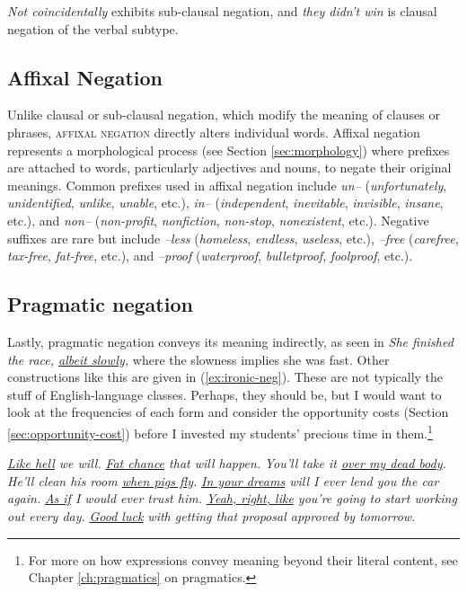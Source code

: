 \textit{Not coincidentally} exhibits sub-clausal negation, and \textit{they didn't win} is clausal negation of the verbal subtype.

\subsection{Affixal Negation}

Unlike clausal or sub-clausal negation, which modify the meaning of clauses or phrases, \textsc{affixal negation} directly alters individual words. Affixal negation represents a morphological process (see Section \ref{sec:morphology}) where prefixes are attached to words, particularly adjectives and nouns, to negate their original meanings. Common prefixes used in affixal negation include \textit{un--} (\textit{unfortunately}, \textit{unidentified}, \textit{unlike}, \textit{unable}, etc.), \textit{in--} (\textit{independent}, \textit{inevitable}, \textit{invisible}, \textit{insane}, etc.), and \textit{non--} (\textit{non-profit}, \textit{nonfiction}, \textit{non-stop}, \textit{nonexistent}, etc.). Negative suffixes are rare but include \textit{--less} (\textit{homeless}, \textit{endless}, \textit{useless}, etc.), \textit{--free} (\textit{carefree}, \textit{tax-free}, \textit{fat-free}, etc.), and \textit{--proof} (\textit{waterproof}, \textit{bulletproof}, \textit{foolproof}, etc.).

\subsection{Pragmatic negation}

Lastly, pragmatic negation conveys its meaning indirectly, as seen in \textit{She finished the race, \uline{albeit slowly},} where the slowness implies she was  fast. Other constructions like this are given in (\ref{ex:ironic-neg}). These are not typically the stuff of English-language classes. Perhaps, they should be, but I would want to look at the frequencies of each form and consider the opportunity costs (Section \ref{sec:opportunity-cost}) before I invested my students' precious time in them.\footnote{For more on how expressions convey meaning beyond their literal content, see Chapter \ref{ch:pragmatics} on pragmatics.}

\ea \label{ex:ironic-neg}
    \ea \textit{\uline{Like hell} we will.}
    \ex \textit{\uline{Fat chance} that will happen.}
    \ex \textit{You'll take it \uline{over my dead body}.}
    \ex \textit{He'll clean his room \uline{when pigs fly}.}
    \ex \textit{\uline{In your dreams} will I ever lend you the car again.}
    \ex \textit{\uline{As if} I would ever trust him.}
    \ex \textit{\uline{Yeah, right, like} you're going to start working out every day.}
    \ex \textit{\uline{Good luck} with getting that proposal approved by tomorrow.}
    \z
\z

